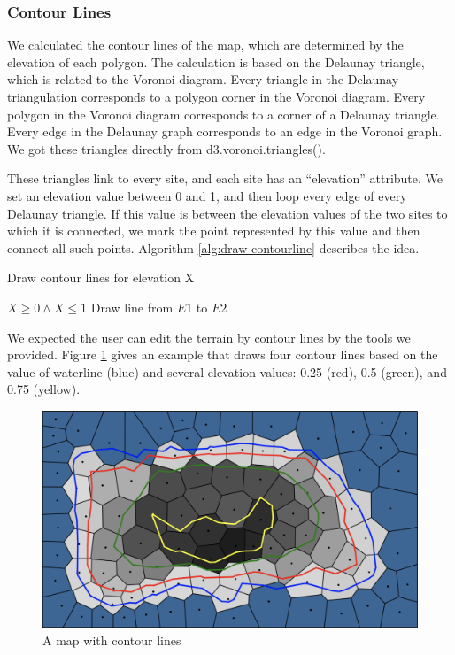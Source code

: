 \subsubsection{Contour Lines}
We calculated the contour lines of the map, which are determined by the elevation of each polygon. The calculation is based on the Delaunay triangle, which is related to the Voronoi diagram. Every triangle in the Delaunay triangulation corresponds to a polygon corner in the Voronoi diagram. Every polygon in the Voronoi diagram corresponds to a corner of a Delaunay triangle. Every edge in the Delaunay graph corresponds to an edge in the Voronoi graph. We got these triangles directly from d3.voronoi.triangles().

These triangles link to every site, and each site has an ``elevation'' attribute. We set an elevation value between 0 and 1, and then loop every edge of every Delaunay triangle. If this value is between the elevation values of the two sites to which it is connected, we mark the point represented by this value and then connect all such points. Algorithm \ref{alg:draw contourline} describes the idea.

\begin{algorithm}
\caption{Draw contour lines for elevation X}
\label{alg:draw contourline}
\begin{algorithmic}
\REQUIRE $X \geq 0 \wedge X \leq 1$
\STATE Draw line from $E1$ to $E2$
\ENDIF
\ENDFOR
\ENDFOR
\end{algorithmic}
\end{algorithm}

We expected the user can edit the terrain by contour lines by the tools we provided. Figure \ref{fig:contour line} gives an example that draws four contour lines based on the value of waterline (blue) and several elevation values: 0.25 (red), 0.5 (green), and 0.75 (yellow).

\begin{figure}[htbp]
  \includegraphics[width=\textwidth]{section04/assets/Map-contourline.png}
  \caption{A map with contour lines}
  \label{fig:contour line}
\end{figure}

